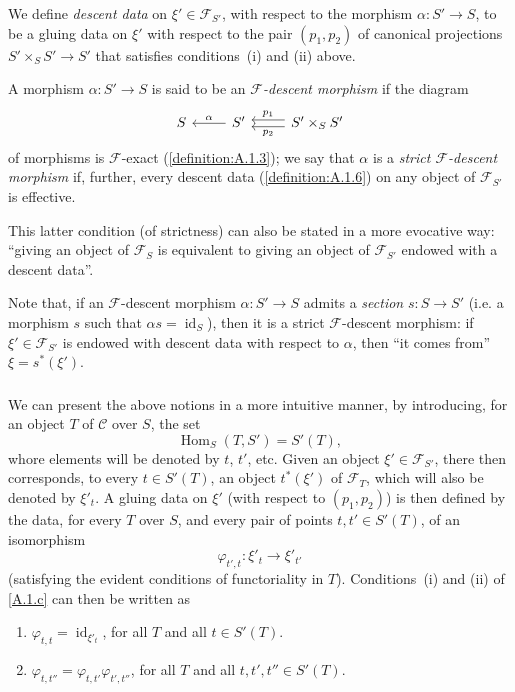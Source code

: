 \documentclass{article}
\theoremstyle{plain}
\theoremstyle{definition}
\newenvironment{definition}[1]
  {\renewcommand\theinnercustomdefinition{#1}\innercustomdefinition}
  {\endinnercustomdefinition}
\newcommand{\sh}[1]{{\mathscr{#1}}}
\newcommand{\cat}[1]{{\mathcal{#1}}}
\DeclareMathOperator{\id}{id}
\DeclareMathOperator{\Hom}{Hom}
\newcommand{\oldpage}[1]{\marginpar{\footnotesize$\Big\vert$ \textit{p.~#1}}}
\begin{document}
\begin{definition}{1.6}
\label{definition:A.1.6}
  We define \emph{descent data} on $\xi'\in\sh{F}_{S'}$, with respect to the morphism $\alpha\colon S'\to S$, to be a gluing data on $\xi'$ with respect to the pair $(p_1,p_2)$ of canonical projections $S'\times_S S'\to S'$ that satisfies conditions~(i) and (ii) above.
\end{definition}

\begin{definition}{1.7}
\label{definition:A.1.7}
  A morphism $\alpha\colon S'\to S$ is said to be an \emph{$\sh{F}$-descent morphism} if the diagram
  \[
    \begin{tikzcd}
      S
      & S' \lar[swap,"\alpha"]
      & S'\times_S S' \lar[shift left=1,"p_2"] \lar[shift right=1,swap,"p_1"]
    \end{tikzcd}
  \]
  of morphisms is $\sh{F}$-exact (\cref{definition:A.1.3});
  we say that $\alpha$ is a \emph{strict $\sh{F}$-descent morphism} if, further, every descent data (\cref{definition:A.1.6}) on any object of $\sh{F}_{S'}$ is effective.

  This latter condition (of strictness) can also be stated in a more evocative way:
  ``giving an object of $\sh{F}_S$ is equivalent to giving an object of $\sh{F}_{S'}$ endowed with a descent data''.
\end{definition}

Note that, if an $\sh{F}$-descent morphism $\alpha\colon S'\to S$ admits a \emph{section} $s\colon S\to S'$ (i.e. a morphism $s$ such that $\alpha s=\id_S$), then it is a strict $\sh{F}$-descent morphism:
if $\xi'\in\sh{F}_{S'}$ is endowed with descent data with respect to $\alpha$, then ``it comes from'' $\xi=s^*(\xi')$.


\subsubsection{}
\label{A.1.d}
We can present the above notions in a more intuitive manner, by introducing, for an object $T$ of $\cat{C}$ over $S$, the set
\[
  \Hom_S(T,S') = S'(T),
\]
whore elements will be denoted by $t$, $t'$, etc.
Given an object $\xi'\in\sh{F}_{S'}$, there then corresponds, to every $t\in S'(T)$, an object $t^*(\xi')$ of $\sh{F}_T$, which will also be denoted by $\xi'_t$.
A gluing data on $\xi'$ (with respect to $(p_1,p_2)$) is then defined by the data, for every $T$ over $S$, and every pair of points $t,t'\in S'(T)$, of an isomorphism
\[
  \varphi_{t',t}\colon \xi'_t \to \xi'_{t'}
\]
(satisfying the evident conditions of functoriality in $T$).
Conditions~(i) and (ii) of \cref{A.1.c} can then be written as
\begin{enumerate}[(i {bis})]
  \item $\varphi_{t,t}=\id_{\xi'_t}$, for all $T$ and all $t\in S'(T)$.
\oldpage{190-06}
  \item $\varphi_{t,t''}=\varphi_{t,t'}\varphi_{t',t''}$, for all $T$ and all $t,t',t''\in S'(T)$.
\end{enumerate}
\end{document}
